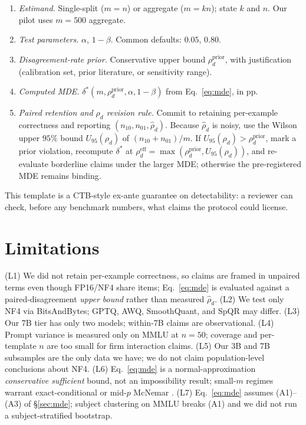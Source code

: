 \documentclass{article}
\begin{document}
\begin{enumerate}
    \itemsep0pt
    \item \textit{Estimand.} Single-split ($m{=}n$) or aggregate ($m{=}kn$); state $k$ and $n$. Our pilot uses $m{=}500$ aggregate.
    \item \textit{Test parameters.} $\alpha$, $1-\beta$. Common defaults: $0.05$, $0.80$.
    \item \textit{Disagreement-rate prior.} Conservative upper bound $\rho^{\text{prior}}_d$, with justification (calibration set, prior literature, or sensitivity range).
    \item \textit{Computed MDE.} $\delta^*(m, \rho^{\text{prior}}_d, \alpha, 1-\beta)$ from Eq.~\ref{eq:mde}, in pp.
    \item \textit{Paired retention and $\rho_d$ revision rule.} Commit to retaining per-example correctness and reporting $(n_{10}, n_{01}, \hat\rho_d)$. Because $\hat\rho_d$ is noisy, use the Wilson upper $95\%$ bound $U_{95}(\rho_d)$ of $(n_{10}+n_{01})/m$. If $U_{95}(\rho_d) > \rho^{\text{prior}}_d$, mark a prior violation, recompute $\delta^*$ at $\rho_d^{\text{eff}}=\max(\rho^{\text{prior}}_d, U_{95}(\rho_d))$, and re-evaluate borderline claims under the larger MDE; otherwise the pre-registered MDE remains binding.
\end{enumerate}

This template is a CTB-style ex-ante guarantee on detectability: a reviewer can check, before any benchmark numbers, what claims the protocol could license.

\section{Limitations}
\label{sec:limits}

(L1) We did not retain per-example correctness, so claims are framed in unpaired terms even though FP16/NF4 share items; Eq.~\ref{eq:mde} is evaluated against a paired-disagreement \emph{upper bound} rather than measured $\hat\rho_d$. (L2) We test only NF4 via BitsAndBytes; GPTQ, AWQ, SmoothQuant, and SpQR may differ. (L3) Our 7B tier has only two models; within-7B claims are observational. (L4) Prompt variance is measured only on MMLU at $n{=}50$; coverage and per-template $n$ are too small for firm interaction claims. (L5) Our 3B and 7B subsamples are the only data we have; we do not claim population-level conclusions about NF4. (L6) Eq.~\ref{eq:mde} is a normal-approximation \emph{conservative sufficient} bound, not an impossibility result; small-$m$ regimes warrant exact-conditional or mid-$p$ McNemar \citep{fagerland2013mcnemar}. (L7) Eq.~\ref{eq:mde} assumes (A1)--(A3) of \S\ref{sec:mde}; subject clustering on MMLU breaks (A1) and we did not run a subject-stratified bootstrap.
\end{document}

